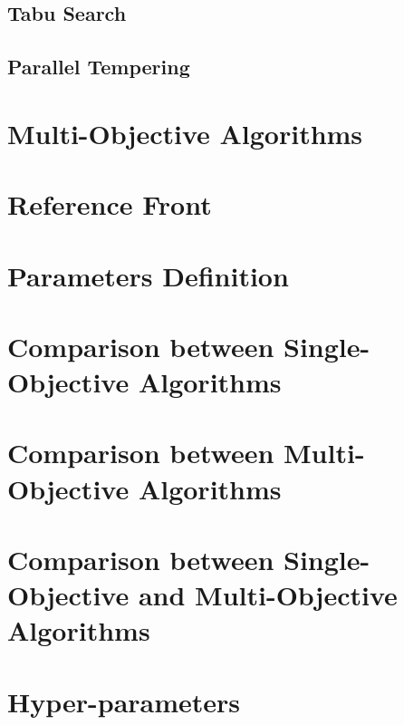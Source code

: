 \subsection{Tabu Search} 
\subsection{Parallel Tempering} 

\section{Multi-Objective Algorithms}

\section{Reference Front}

\section{Parameters Definition}

\section{Comparison between Single-Objective Algorithms}

\section{Comparison between Multi-Objective Algorithms}

\section{Comparison between Single-Objective and Multi-Objective Algorithms}

\section{Hyper-parameters}

